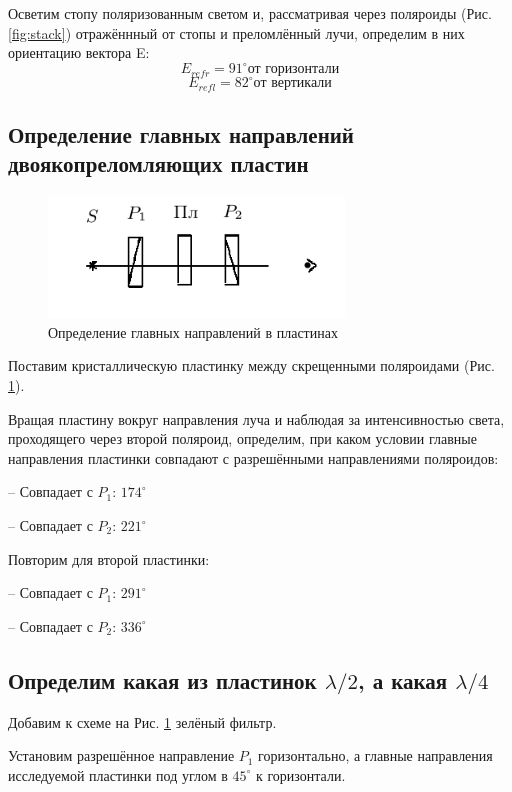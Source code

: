 \documentclass{article}
\begin{document}
Осветим стопу поляризованным светом и, рассматривая через поляроиды (Рис. \ref{fig:stack}) отражённный от стопы и преломлённый лучи, определим в них ориентацию вектора E:
\[ E_{refr} = 91^\circ \text{от горизонтали}\]
\[ E_{refl} = 82^\circ \text{от вертикали} \]

\subsection{Определение главных направлений двоякопреломляющих пластин}

\begin{figure}[H]
    \centering
    \includegraphics[width=0.7\textwidth]{main-directions.png}
    \caption{Определение главных направлений в пластинах}
    \label{fig:main-dir}
\end{figure} 

Поставим кристаллическую пластинку между скрещенными поляроидами (Рис. \ref{fig:main-dir}).

Вращая пластину вокруг направления луча и наблюдая за интенсивностью света, проходящего через второй поляроид,
определим, при каком условии главные направления пластинки совпадают с разрешёнными направлениями поляроидов:

-- Совпадает с \(P_1\): \(174^\circ\)

-- Совпадает с \(P_2\): \(221^\circ\)

Повторим для второй пластинки:

-- Совпадает с \(P_1\): \(291^\circ\)

-- Совпадает с \(P_2\): \(336^\circ\)


\subsection{Определим какая из пластинок \(\lambda/2\), а какая \(\lambda/4\)}

Добавим к схеме на Рис. \ref{fig:main-dir} зелёный фильтр.

Установим разрешённое направление \(P_1\) горизонтально, а главные направления исследуемой пластинки под углом 
в \(45^\circ\) к горизонтали.
\end{document}
